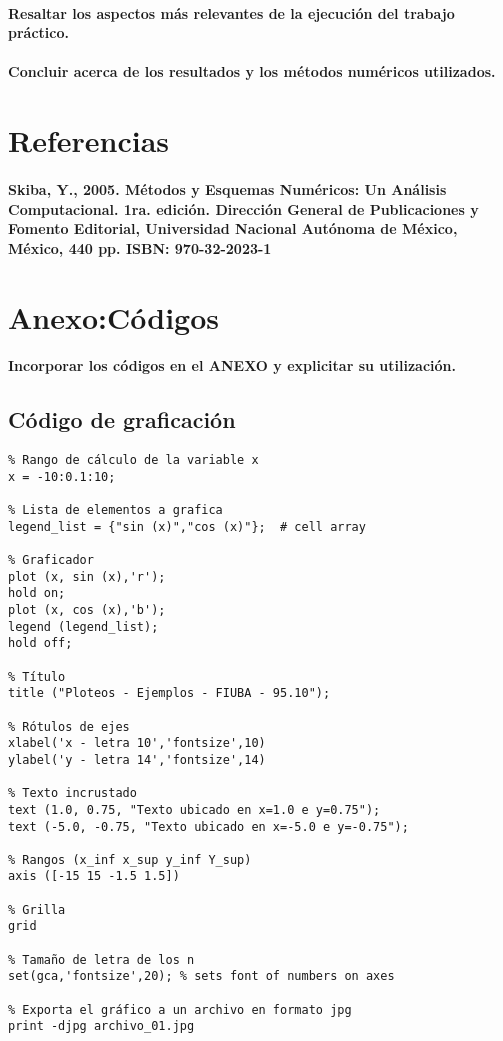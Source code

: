 \documentclass[a4paper,12pt]{article}
\begin{document}
\paragraph{\normalfont Resaltar los aspectos más relevantes de la ejecución del trabajo práctico.}
\paragraph{\normalfont Concluir acerca de los resultados y los métodos numéricos utilizados.}

\section{Referencias}

\paragraph{\normalfont Skiba, Y., 2005. Métodos y Esquemas Numéricos: Un Análisis Computacional. 1ra. edición. Dirección General de Publicaciones y Fomento Editorial, Universidad Nacional Autónoma de México, México, 440 pp. ISBN: 970-32-2023-1}

\section{Anexo:Códigos}

\paragraph{\normalfont Incorporar los códigos en el ANEXO y explicitar su utilización.}

\subsection{Código de graficación}
\begin{verbatim}
% Rango de cálculo de la variable x
x = -10:0.1:10;

% Lista de elementos a grafica
legend_list = {"sin (x)","cos (x)"};  # cell array

% Graficador
plot (x, sin (x),'r');
hold on;
plot (x, cos (x),'b');
legend (legend_list);
hold off;

% Título
title ("Ploteos - Ejemplos - FIUBA - 95.10");

% Rótulos de ejes
xlabel('x - letra 10','fontsize',10)
ylabel('y - letra 14','fontsize',14) 

% Texto incrustado
text (1.0, 0.75, "Texto ubicado en x=1.0 e y=0.75");
text (-5.0, -0.75, "Texto ubicado en x=-5.0 e y=-0.75");

% Rangos (x_inf x_sup y_inf Y_sup)
axis ([-15 15 -1.5 1.5])

% Grilla
grid

% Tamaño de letra de los n
set(gca,'fontsize',20); % sets font of numbers on axes 

% Exporta el gráfico a un archivo en formato jpg
print -djpg archivo_01.jpg 
\end{verbatim}
\end{document}

